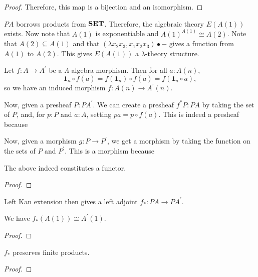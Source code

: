 \begin{proof}
  Therefore, this map is a bijection and an isomorphism.
\end{proof}

\begin{definition}
  $ PA $ borrows products from $ \mathbf{SET} $. Therefore, the algebraic theory $ E(A(1)) $ exists. Now note that $ A(1) $ is exponentiable and $ A(1)^{A(1)} \cong A(2) $.
  Note that $ A(2) \subseteq A(1) $ and that $ (\lambda x_2 x_3, x_1 x_2 x_3) \bullet - $ gives a function from $ A(1) $ to $ A(2) $. This gives $ E(A(1)) $ a $ \lambda $-theory structure.
\end{definition}

\begin{definition}
  Let $ f: A \to A^\prime $ be a $ \Lambda $-algebra morphism. Then for all $ a: A(n) $,
  \[ \mathbf 1_n \circ f(a) = f(\mathbf 1_n) \circ f(a) = f(\mathbf 1_n \circ a), \]
  so we have an induced morphism $ f: A(n) \to A^\prime(n) $.

  Now, given a presheaf $ P: PA^\prime $. We can create a presheaf $ f^* P : PA $ by taking the set of $ P $, and, for $ p: P $ and $ a: A $, setting $ pa = p \circ f(a) $. This is indeed a presheaf because \TODO

  Now, given a morphism $ g: P \to P^\prime $, we get a morphism by taking the function on the sets of $ P $ and $ P^\prime $. This is a morphism because \TODO
\end{definition}

\begin{lemma}
  The above indeed constitutes a functor.
\end{lemma}
\begin{proof}
  \TODO
\end{proof}

Left Kan extension then gives a left adjoint $ f_*: PA \to PA^\prime $.

\begin{lemma}
  We have $ f_*(A(1)) \cong A^\prime(1) $.
\end{lemma}
\begin{proof}
  \TODO
\end{proof}

\begin{lemma}
  $ f_* $ preserves finite products.
\end{lemma}
\begin{proof}
  \TODO
\end{proof}

